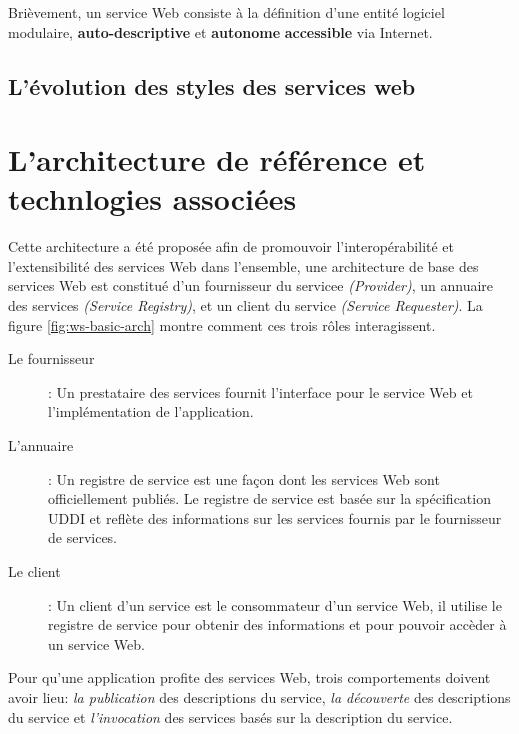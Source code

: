 
  Brièvement, un service Web consiste à la définition d'une entité
  logiciel modulaire, \textbf{auto-descriptive} et \textbf{autonome}
  \textbf{accessible} via Internet.

  \subsection{L'évolution des styles des services web}
  \label{sec:levol-des-styl}
  
  \newpage

\section{L'architecture de référence et technlogies associées}
\label{sec:reference-arch}
Cette architecture a été proposée afin de promouvoir
l'interopérabilité et l'extensibilité des services Web dans
l'ensemble, une architecture de base des services Web est constitué
d'un fournisseur du servicee \textit{(Provider)}, un annuaire des
services \textit{(Service Registry)}, et un client du service
\textit{(Service Requester)}. La figure \ref{fig:ws-basic-arch} montre
comment ces trois rôles interagissent.



\SpecialItem
\begin{description}
\item[Le fournisseur]: Un prestataire des services fournit l'interface
  pour le service Web et l'implémentation de l'application.
  
\item[L'annuaire]: Un registre de service est une façon dont les
  services Web sont officiellement publiés. Le registre de service est
  basée sur la spécification \textsc{UDDI} et reflète des informations
  sur les services fournis par le fournisseur de services.
  
\item[Le client]: Un client d'un service est le consommateur d'un
  service Web, il utilise le registre de service pour obtenir des
  informations et pour pouvoir accèder à un service Web.
\end{description}

Pour qu'une application profite des services Web, trois comportements
doivent avoir lieu: \textit{la publication} des descriptions du
service, \textit{la découverte} des descriptions du service et
\textit{l'invocation} des services basés sur la description du
service.

